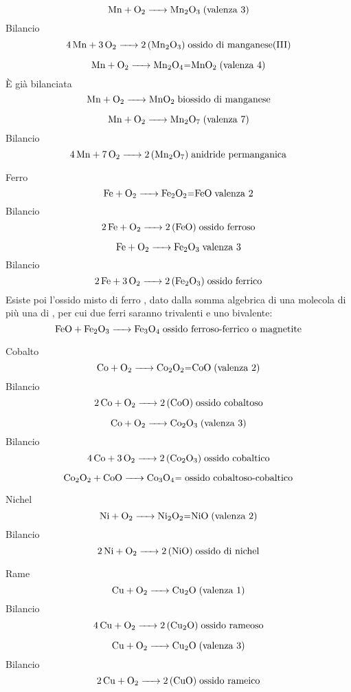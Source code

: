 $$\ce{ Mn + O_2 -> Mn_2O_3} \; \text{(valenza 3)}$$ Bilancio
$$\ce{ 4 Mn + 3O_2 -> 2 (Mn_2O_3)} \; \text{ossido di manganese(III)}$$

$$\ce{ Mn + O_2 -> Mn_2O_4=MnO_2} \; \text{(valenza 4)}$$ È già bilanciata
$$\ce{ Mn + O_2 -> MnO_2} \; \text{biossido di manganese}$$ 

$$\ce{ Mn + O_2 -> Mn_2O_7} \; \text{(valenza 7)}$$ Bilancio
$$\ce{ 4 Mn + 7O_2 -> 2 (Mn_2O_7)} \; \text{anidride permanganica}$$

Ferro 
$$\ce{ Fe + O_2 -> Fe_2O_2=FeO} \; \text{valenza 2}$$ Bilancio
$$\ce{ 2 Fe + O_2 -> 2 (FeO)} \; \text{ossido ferroso}$$

$$\ce{ Fe + O_2 -> Fe_2O_3} \; \text{valenza 3}$$ Bilancio
$$\ce{ 2 Fe + 3O_2 -> 2 (Fe_2O_3)} \; \text{ossido ferrico}$$
Esiste poi l'ossido misto di ferro , dato dalla somma algebrica di una molecola di  più una di , per cui due ferri saranno trivalenti e uno bivalente:
$$\ce{FeO + Fe_2O_3 -> Fe_3O_4} \; \text{ossido ferroso-ferrico o magnetite}$$

Cobalto
$$\ce{ Co + O_2 -> Co_2O_2=CoO} \; \text{(valenza 2)}$$ Bilancio
$$\ce{ 2 Co + O_2 -> 2 (CoO)} \; \text{ossido cobaltoso}$$

$$\ce{ Co + O_2 -> Co_2O_3} \; \text{(valenza 3)}$$ Bilancio
$$\ce{ 4 Co + 3 O_2 -> 2 (Co_2O_3)} \; \text{ossido cobaltico}$$

$$\ce{ Co_2O_2 + CoO -> Co_3O_4=} \; \text{ossido cobaltoso-cobaltico}$$

Nichel
$$\ce{ Ni + O_2 -> Ni_2O_2=NiO} \; \text{(valenza 2)}$$ Bilancio
$$\ce{ 2 Ni + O_2 -> 2 (NiO)} \; \text{ossido di nichel}$$

Rame
$$\ce{ Cu + O_2 -> Cu_2O} \; \text{(valenza 1)}$$ Bilancio
$$\ce{ 4 Cu + O_2 -> 2 (Cu_2O)} \; \text{ossido rameoso}$$

$$\ce{ Cu + O_2 -> Cu_2O} \; \text{(valenza 3)}$$ Bilancio
$$\ce{ 2 Cu + O_2 -> 2 (CuO)} \; \text{ossido rameico}$$